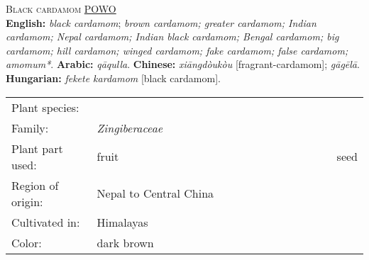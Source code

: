 \begin{spice}\label{spice:black cardamom}
\textsc{Black cardamom} \hfill \href{https://powo.science.kew.org/taxon/urn:lsid:ipni.org:names:872166-1}{POWO} \\
\textbf{English:} \textit{black cardamom}; \textit{brown cardamom; greater cardamom; Indian cardamom; Nepal cardamom; Indian black cardamom; Bengal cardamom; big cardamom; hill cardamon; winged cardamom; fake cardamom; false cardamom; amomum*}. 
\textbf{Arabic:} {} \textit{qāqulla}. 
\textbf{Chinese:} {} \textit{xiāngdòukòu} [fragrant-cardamom];  \textit{gāgēlā}. 
\textbf{Hungarian:} \textit{fekete kardamom} [black cardamom].  \\
\noindent{\color{black}\rule[0.5ex]{\linewidth}{.5pt}}
\begin{tabular}{@{}p{0.25\linewidth}@{}p{0.75\linewidth}@{}}
Plant species: &  \\
Family: & \textit{Zingiberaceae} \\
Plant part used: & fruit & seed \\
Region of origin: & Nepal to Central China \\
Cultivated in: & Himalayas \\
Color: & dark brown \\
\end{tabular}
\end{spice}